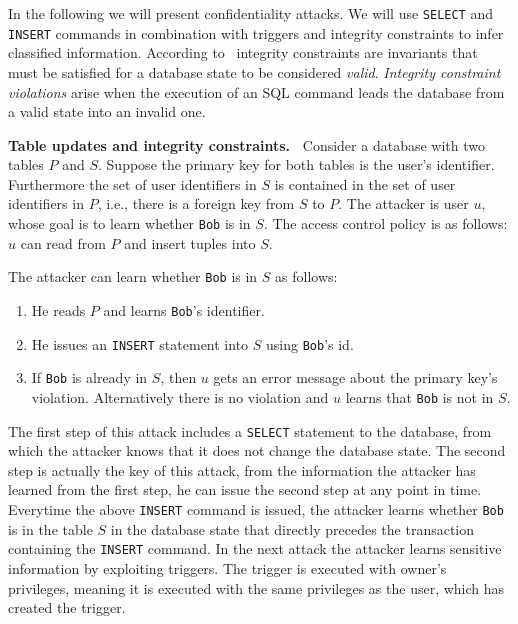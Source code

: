 In the following we will present confidentiality attacks. 
%
We will use \texttt{SELECT} and \texttt{INSERT} commands in combination with triggers and integrity constraints to infer classified information.
%
According to~\cite{guarnieri2016strong} integrity constraints are invariants that must be satisfied for a database state to be considered \emph{valid}.
%
\emph{Integrity constraint violations} arise when the execution of an SQL command leads the database from a valid state into an invalid one.
%
\begin{attack}
{\bf Table updates and integrity constraints.~\cite{guarnieri2016strong}}
%
Consider a database with two tables $P$ and $S$. 
%
Suppose the primary key for both tables is the user's identifier.
%
Furthermore the set of user identifiers in $S$ is contained in the set of user identifiers in $P$, i.e., there is a foreign key from $S$ to $P$.
%
The attacker is user $u$, whose goal is to learn whether \texttt{Bob} is in $S$.
%
The access control policy is as follows: $u$ can read from $P$ and insert tuples into $S$.

The attacker can learn whether \texttt{Bob} is in $S$ as follows:
\begin{enumerate}
	\item He reads $P$ and learns \texttt{Bob}'s identifier.
	\item He issues an \texttt{INSERT} statement into $S$ using \texttt{Bob}'s id.
	\item If \texttt{Bob} is already in $S$, then $u$ gets an error message about the primary key's violation. Alternatively there is no violation and $u$ learns that \texttt{Bob} is not in $S$.
\end{enumerate}
\end{attack}
%
The first step of this attack includes a \texttt{SELECT} statement to the database, from which the attacker knows that it does not change the database state.
%
The second step is actually the key of this attack, from the information the attacker has learned from the first step, he can issue the second step at any point in time.
%
Everytime the above \texttt{INSERT} command is issued, the attacker learns whether \texttt{Bob} is in the table $S$ in the database state that directly precedes the transaction containing the \texttt{INSERT} command.
%
In the next attack the attacker learns sensitive information by exploiting triggers.
%
The trigger is executed with owner's privileges, meaning it is executed with the same privileges as the user, which has created the trigger.

